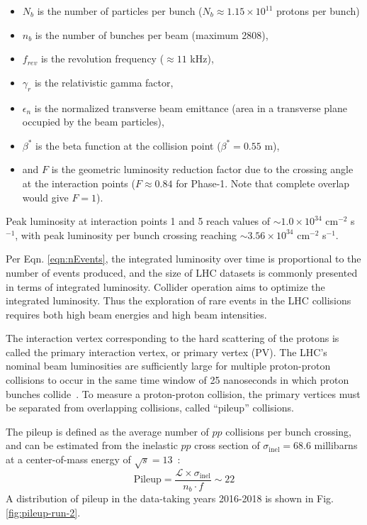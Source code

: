 \begin{itemize}
    \item $N_b$ is the number of particles per bunch ($N_b \approx 1.15 \times 10^{11}$ protons per bunch)
    \item $n_b$ is the number of bunches per beam (maximum 2808),
    \item $f_{rev}$ is the revolution frequency ($\approx 11$ kHz),
    \item $\gamma_r$ is the relativistic gamma factor,
    \item $\epsilon_n$ is the normalized transverse beam emittance (area in a transverse plane occupied by the beam particles),
    \item $\beta^*$ is the beta function at the collision point ($\beta^* = 0.55$ m),
    \item and $F$ is the geometric luminosity reduction factor due to the crossing angle at the interaction points ($F \approx 0.84$ for Phase-1. Note that complete overlap would give $F = 1$).
\end{itemize}
Peak luminosity at interaction points 1 and 5 reach values of $\sim 1.0 \times 10^{34}$ cm$^{-2}$ s$^{-1}$, with peak luminosity per bunch crossing reaching $\sim 3.56 \times 10^{34}$ cm$^{-2}$ s$^{-1}$.

Per Eqn. \ref{eqn:nEvents}, the integrated luminosity over time is proportional to the number of events produced, and the size of LHC datasets is commonly presented in terms of integrated luminosity. Collider operation aims to optimize the integrated luminosity. Thus the exploration of rare events in the LHC collisions requires both high beam energies and high beam intensities.

The interaction vertex corresponding to the hard scattering of the protons is called the primary interaction vertex, or primary vertex (PV). The LHC's nominal beam luminosities are sufficiently large for multiple proton-proton collisions to occur in the same time window of 25 nanoseconds in which proton bunches collide~\cite{CMS-JME-18-001}. To measure a proton-proton collision, the primary vertices must be separated from overlapping collisions, called ``pileup'' collisions. 

The pileup is defined as the average number of $pp$ collisions per bunch crossing, and can be estimated from the inelastic $pp$ cross section of $\sigma_{\text{inel}} = 68.6$ millibarns at a center-of-mass energy of $\sqrt{s} = 13$\TeV~\cite{CERN-EP-2018-004-pileup}:
\begin{equation}
    \text{Pileup} = \frac{\mathcal{L} \times \sigma_{\text{inel}}}{ n_b \cdot f} \sim 22
\end{equation}
A distribution of pileup in the data-taking years 2016-2018 is shown in Fig. \ref{fig:pileup-run-2}.

